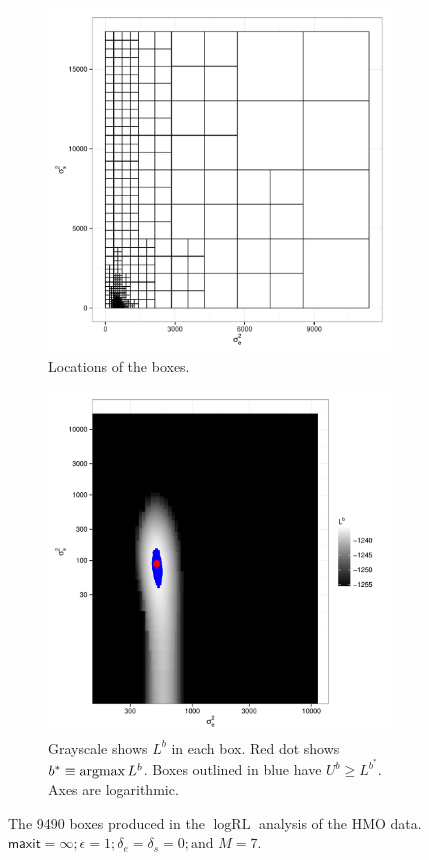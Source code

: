 \documentclass[ejs]{imsart}
\newcommand{\textcompute}{\textsf}
\newcommand{\RLorig}{\text{RL}}
\newcommand{\logRLorig}{\log\RLorig}
\newcommand{\maxit}{\textcompute{maxit}}
\newcommand{\argmax}{\operatornamewithlimits{argmax}}
\begin{document}
\begin{figure}
  \begin{subfigure}{.5\textwidth}
	\centering
	\includegraphics[width=.8\linewidth]{figs/hmo_HH11_boxes.pdf}
	\caption{Locations of the boxes.}
	\label{fig:hmoboxes}
  \end{subfigure}
  \begin{subfigure}{.5\textwidth}
	\centering
	\includegraphics[width=.8\linewidth]{figs/hmo_HH11_rll.pdf}
	\caption{Grayscale shows $L^b$ in each box.  Red dot shows $b^* \equiv\argmax L^b$.
	Boxes outlined in blue have $U^b \ge L^{b^*}$.  Axes are logarithmic.}
	\label{fig:hmorll}
  \end{subfigure}
  \caption{The 9490 boxes produced in the
	$\logRLorig$ analysis of the HMO data. $\maxit=\infty; \epsilon=1;
	\delta_e= \delta_s= 0; \text{and\ } M=7$.}
  \label{fig:hmo1}
\end{figure}
\end{document}
